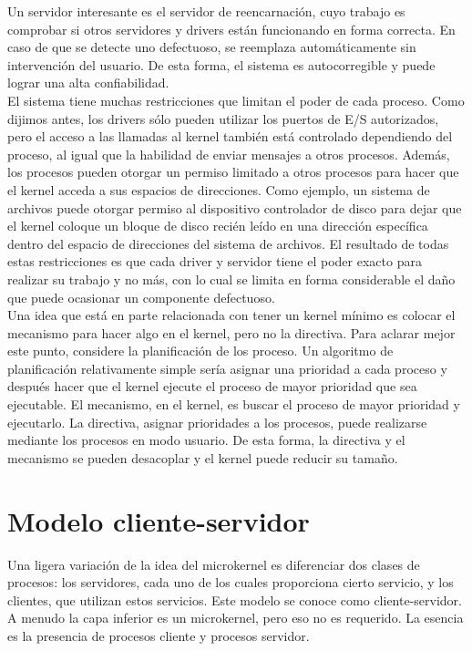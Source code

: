 \documentclass[10pt,a4paper,spanish]{report}
\begin{document}
  \noindent
  Un servidor interesante es el servidor de reencarnación, cuyo trabajo es comprobar si otros servidores y drivers están funcionando en forma correcta. En caso de que se detecte uno defectuoso, se reemplaza automáticamente sin intervención del usuario. De esta forma, el sistema es autocorregible y puede lograr una alta confiabilidad. \\

  \noindent
  El sistema tiene muchas restricciones que limitan el poder de cada proceso. Como dijimos antes, los drivers sólo pueden utilizar los puertos de E/S autorizados, pero el acceso a las llamadas al kernel también está controlado dependiendo del proceso, al igual que la habilidad de enviar mensajes a otros procesos. Además, los procesos pueden otorgar un permiso limitado a otros procesos para hacer que el kernel acceda a sus espacios de direcciones. Como ejemplo, un sistema de archivos puede otorgar permiso al dispositivo controlador de disco para dejar que el kernel coloque un bloque de disco recién leído en una dirección específica dentro del espacio de direcciones del sistema de archivos. El resultado de todas estas restricciones es que cada driver y servidor tiene el poder exacto para realizar su trabajo y no más, con lo cual se limita en forma considerable el daño que puede ocasionar un componente defectuoso. \\

  \noindent
  Una idea que está en parte relacionada con tener un kernel mínimo es colocar el mecanismo para hacer algo en el kernel, pero no la directiva. Para aclarar mejor este punto, considere la planificación de los proceso. Un algoritmo de planificación relativamente simple sería asignar una prioridad a cada proceso y después hacer que el kernel ejecute el proceso de mayor prioridad que sea ejecutable. El mecanismo, en el kernel, es buscar el proceso de mayor prioridad y ejecutarlo. La directiva, asignar prioridades a los procesos, puede realizarse mediante los procesos en modo usuario. De esta forma, la directiva y el mecanismo se pueden desacoplar y el kernel puede reducir su tamaño.


  \section{Modelo cliente-servidor}

  \noindent
  Una ligera variación de la idea del microkernel es diferenciar dos clases de procesos: los servidores, cada uno de los cuales proporciona cierto servicio, y los clientes, que utilizan estos servicios. Este modelo se conoce como cliente-servidor. A menudo la capa inferior es un microkernel, pero eso no es requerido. La esencia es la presencia de procesos cliente y procesos servidor. \\
\end{document}
